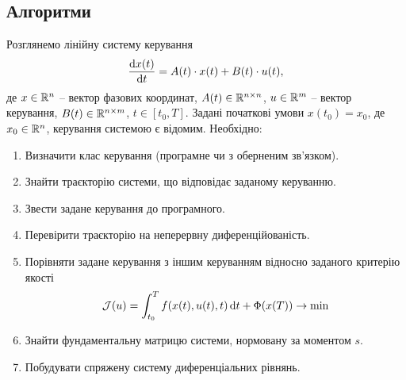 \subsection{Алгоритми}

\begin{problem*}
	Розглянемо лінійну систему керування 
	\begin{equation} 
	    \label{eq:algo-1-1}
	    \frac{\mathop{}\!\mathrm{d} x(t)}{\mathop{}\!\mathrm{d} t} = A (t) \cdot x(t) + B(t) \cdot u(t),
	\end{equation} 
	де $x \in \mathbb{R}^n$ -- вектор фазових координат, $A(t) \in \mathbb{R}^{n\times n}$, $u \in \mathbb{R}^m$ -- вектор керування, $B(t) \in \mathbb{R}^{n \times m}$, $t \in [t_0, T]$. Задані початкові умови $x(t_0) = x_0$, де $x_0 \in \mathbb{R}^n$, керування системою є відомим. Необхідно:
	\begin{enumerate}
		\item Визначити клас керування (програмне чи з оберненим зв'язком).
		\item Знайти траєкторію системи, що відповідає заданому керуванню.
		\item Звести задане керування до програмного.
		\item Перевірити траєкторію на неперервну диференційованість.
		\item Порівняти задане керування з іншим керуванням відносно заданого критерію якості 
		\begin{equation}
		    \label{eq:algo-1-2}
		    \mathcal{J}(u) = \int_{t_0}^T f(x(t), u(t), t) \mathop{}\!\mathrm{d} t + \Phi(x(T)) \to \min    
		\end{equation}
		\item Знайти фундаментальну матрицю системи, нормовану за моментом $s$. %
		\item Побудувати спряжену систему диференціальних рівнянь.
	\end{enumerate}
\end{problem*}

